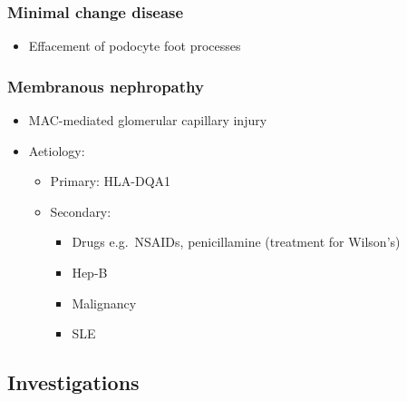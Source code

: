 \documentclass[
  12pt,
]{memoir}
\providecommand{\tightlist}{%
  \setlength{\itemsep}{0pt}\setlength{\parskip}{0pt}}
\begin{document}
\hypertarget{minimal-change-disease}{%
\subsubsection{Minimal change disease}\label{minimal-change-disease}}

\begin{itemize}
\tightlist
\item
  Effacement of podocyte foot processes
\end{itemize}

\hypertarget{membranous-nephropathy}{%
\subsubsection{Membranous nephropathy}\label{membranous-nephropathy}}

\begin{itemize}
\tightlist
\item
  MAC-mediated glomerular capillary injury
\item
  Aetiology:

  \begin{itemize}
  \tightlist
  \item
    Primary: HLA-DQA1
  \item
    Secondary:

    \begin{itemize}
    \tightlist
    \item
      Drugs e.g.~NSAIDs, penicillamine (treatment for Wilson's)
    \item
      Hep-B
    \item
      Malignancy
    \item
      SLE
    \end{itemize}
  \end{itemize}
\end{itemize}

\hypertarget{investigations-1}{%
\subsection{Investigations}\label{investigations-1}}
\end{document}
